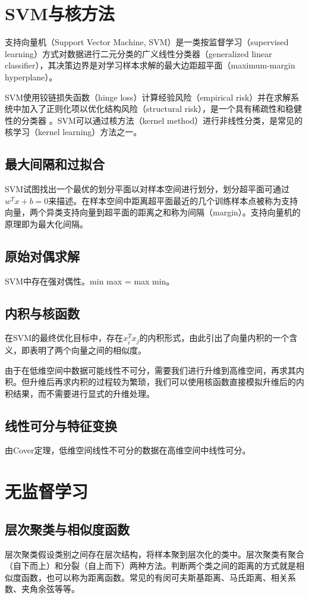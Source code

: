 \documentclass[12pt]{article}
\begin{document}
\section{SVM与核方法}
支持向量机（Support Vector Machine, SVM）是一类按监督学习（supervised learning）方式对数据进行二元分类的广义线性分类器（generalized linear classifier），其决策边界是对学习样本求解的最大边距超平面（maximum-margin hyperplane）。\par
SVM使用铰链损失函数（hinge loss）计算经验风险（empirical risk）并在求解系统中加入了正则化项以优化结构风险（structural risk），是一个具有稀疏性和稳健性的分类器 。SVM可以通过核方法（kernel method）进行非线性分类，是常见的核学习（kernel learning）方法之一。\par
\subsection{最大间隔和过拟合}
SVM试图找出一个最优的划分平面以对样本空间进行划分，划分超平面可通过$w^Tx+b=0$来描述。在样本空间中距离超平面最近的几个训练样本点被称为支持向量，两个异类支持向量到超平面的距离之和称为间隔（margin）。支持向量机的原理即为最大化间隔。\par
\subsection{原始对偶求解}
SVM中存在强对偶性。min max = max min。\par
\subsection{内积与核函数}
在SVM的最终优化目标中，存在$x_i^Tx_j$的内积形式，由此引出了向量内积的一个含义，即表明了两个向量之间的相似度。\par
由于在低维空间中数据可能线性不可分，需要我们进行升维到高维空间，再求其内积。但升维后再求内积的过程较为繁琐，我们可以使用核函数直接模拟升维后的内积结果，而不需要进行显式的升维处理。\par
\subsection{线性可分与特征变换}
由Cover定理，低维空间线性不可分的数据在高维空间中线性可分。\par
\section{无监督学习}
\subsection{层次聚类与相似度函数}
层次聚类假设类别之间存在层次结构，将样本聚到层次化的类中。层次聚类有聚合（自下而上）和分裂（自上而下）两种方法。判断两个类之间的距离的方式就是相似度函数，也可以称为距离函数。常见的有闵可夫斯基距离、马氏距离、相关系数、夹角余弦等等。\par
\end{document}
